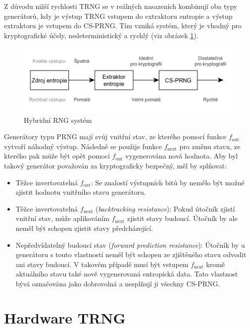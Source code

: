 \documentclass[a4paper,12pt]{article}
\begin{document}
	Z důvodu nižší rychlosti TRNG se v reálných nasazeních kombinují oba typy generátorů, kdy je výstup TRNG vstupem do extraktoru entropie a výstup extraktoru je vstupem do CS-PRNG. Tím vzniká systém, který je vhodný pro kryptografické účely, nedeterministický a rychlý (viz obrázek \ref{_tag_img_hybridsystem}).
	
	\begin{figure}[ht]
		\centering
		\includegraphics[width=\textwidth]{src/img0}
		\caption{Hybridní RNG systém}
		\label{_tag_img_hybridsystem}
	\end{figure}
	
	Generátory typu PRNG mají svůj vnitřní stav, ze kterého pomocí funkce $f_\mathrm{out}$ vytvoří náhodný výstup. Následně se použije funkce $f_\mathrm{next}$ pro změnu stavu, ze kterého pak může být opět pomocí $f_\mathrm{out}$ vygenerována nová hodnota. Aby byl takový generátor považován za kryptograficky bezpečný, měl by splňovat:
	\begin{itemize}
		\item Těžce invertovatelná $f_\mathrm{out}$: Se znalostí výstupních bitů by nemělo být možné zjistit hodnotu vnitřního stavu generátoru.
		\item Těžce invertovatelná $f_\mathrm{next}$ (\textit{backtracking resistance}): Pokud útočník zjistí vnitřní stav, může aplikováním $f_\mathrm{next}$ zjistit stavy budoucí. Útočník by ale neměl být schopen zjistit stavy předcházející.
		\item Nepředvídatelný budoucí stav (\textit{forward prediction resistance}): Útočník by u generátoru s touto vlastností neměl být schopen ze zjištěného stavu odvodit ani stavy budoucí. V takovém případě musí být vstupem $f_\mathrm{next}$ kromě aktuálního stavu také nově vygenerovaná entropická data. Tato vlastnost bývá označována jako dobrovolná a nesplňují ji všechny CS-PRNG.
	\end{itemize}
	
	\section{Hardware TRNG}
	
\end{document}
